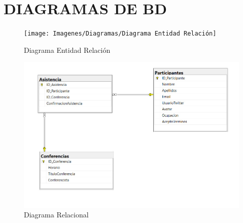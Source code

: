 \chapter{DIAGRAMAS DE BD}


\begin{figure}[H]
	\centering
	\texttt{[image: Imagenes/Diagramas/Diagrama Entidad Relación]}
	\caption{Diagrama Entidad Relación}
	\label{fig:diagrama-entidad-relacion}
\end{figure}


\begin{figure}[H]
	\centering
	\includegraphics[width=0.9\linewidth]{Imagenes/Diagramas/diagrama bd}
	\caption{Diagrama Relacional}
	\label{fig:diagrama-bd}
\end{figure}
